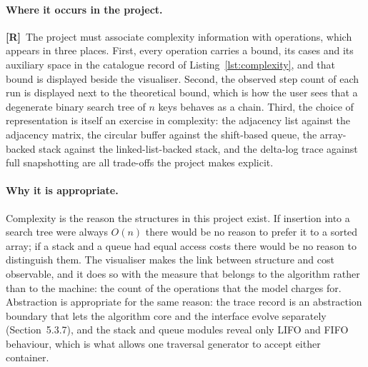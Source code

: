 \documentclass[11pt,a4paper]{article}
\newcommand{\R}{\textcolor{reqc}{\textbf{[R]}}}     %
\begin{document}
\paragraph{Where it occurs in the project.} \R\ The project must associate complexity
information with operations, which appears in three places. First, every operation carries a
bound, its cases and its auxiliary space in the catalogue record of Listing~\ref{lst:complexity}, and that bound
is displayed beside the visualiser. Second, the observed step count of each run is displayed
next to the theoretical bound, which is how the user sees that a degenerate binary search
tree of $n$ keys behaves as a chain. Third, the choice of representation is itself an
exercise in complexity: the adjacency list against the adjacency matrix, the circular buffer
against the shift-based queue, the array-backed stack against the linked-list-backed stack,
and the delta-log trace against full snapshotting are all trade-offs the project makes
explicit.

\paragraph{Why it is appropriate.} Complexity is the reason the structures in this project
exist. If insertion into a search tree were always $O(n)$ there would be no reason to prefer
it to a sorted array; if a stack and a queue had equal access costs there would be no reason
to distinguish them. The visualiser makes the link between structure and cost observable, and
it does so with the measure that belongs to the algorithm rather than to the machine: the
count of the operations that the model charges for. Abstraction is appropriate for the same
reason: the trace record is an abstraction boundary that lets the algorithm core and the
interface evolve separately (Section~5.3.7), and the stack and queue modules reveal only
LIFO and FIFO behaviour, which is what allows one traversal generator to accept either
container.
\end{document}
